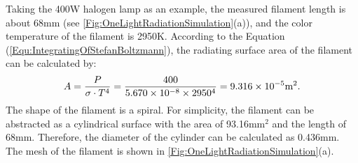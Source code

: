 


Taking the 400W halogen lamp as an example, the measured filament length is about 68mm (see \ref{Fig:OneLightRadiationSimulation}(a)), and the color temperature of the filament is 2950K. According to the Equation (\ref{Equ:IntegratingOfStefanBoltzmann}), the radiating surface area of the filament can be calculated by:
\begin{equation}
A = \frac{P}{\sigma \cdot T^4} = \frac{400}{5.670\times10^{-8}\times2950^4}=9.316\times10^{-5} {\rm{m }}^2.
\end{equation}
The shape of the filament is a spiral.
For simplicity, the filament can be abstracted as a cylindrical surface with the area of 93.16mm$^2$ and the length of 68mm. Therefore, the diameter of the cylinder can be calculated as 0.436mm. The mesh of the filament is shown in \ref{Fig:OneLightRadiationSimulation}(a).

